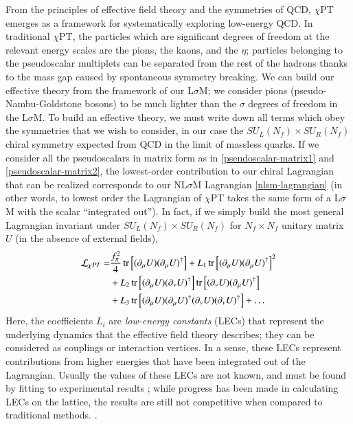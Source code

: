 \documentclass[aps,prd,onecolumn,showpacs,amsmath,amssymb,nofootinbib]{revtex4} \pdfoutput=1
\newcommand{\lsm}{L$\sigma$M}
\newcommand{\nlsm}{NL$\sigma$M}
\newcommand{\cpt}{$\chi$PT}
\begin{document}
From the principles of effective field theory and the symmetries of QCD, {\cpt} emerges as a framework for systematically exploring low-energy QCD. In traditional \cpt, the particles which are significant degrees of freedom at the relevant energy scales are the pions, the kaons, and the $\eta$; particles belonging to the pseudoscalar multiplets can be separated from the rest of the hadrons thanks to the mass gap caused by spontaneous symmetry breaking. We can build our effective theory from the framework of our {\lsm}; we consider pions (pseudo-Nambu-Goldstone bosons) to be much lighter than the $\sigma$ degrees of freedom in the {\lsm}. To build an effective theory, we must write down all terms which obey the symmetries that we wish to consider, in our case the ${S\!U}_L(N_f)\times {S\!U}_R(N_f)$ chiral symmetry expected from QCD in the limit of massless quarks. If we consider all the pseudoscalars in matrix form as in \eqref{pseudoscalar-matrix1} and \eqref{pseudoscalar-matrix2}, the lowest-order contribution to our chiral Lagrangian that can be realized corresponds to our {\nlsm} Lagrangian \eqref{nlsm-lagrangian} (in other words, to lowest order the Lagrangian of {\cpt} takes the same form of a {\lsm} with the scalar ``integrated out''). In fact, if we simply build the most general Lagrangian invariant under ${S\!U}_L(N_f)\times {S\!U}_R(N_f)$ for $N_f \times N_f$ unitary matrix $U$ (in the absence of external fields),
\begin{align}
    \label{cpt-lagrangian-massless}
    \mathcal{L}_{\chi PT} = & \frac{f_{\pi}^{2}}{4} \tr \left[(\partial_{\mu} U)(\partial_{\mu} U)^{\dagger}\right] + L_{1} \tr \left[(\partial_{\mu} U)(\partial_{\mu} U)^{\dagger}\right]^{2} \\
    & + L_{2}\tr \left[(\partial_{\mu} U)(\partial_{\nu} U)^{\dagger}\right]\tr \left[(\partial_{\nu} U)(\partial_{\mu} U)^{\dagger}\right] \\
    & + L_{3} \tr \left[(\partial_{\mu} U)(\partial_{\mu} U)^{\dagger}(\partial_{\nu} U)(\partial_{\nu} U)^{\dagger} \right] + \ldots
\end{align}
Here, the coefficients $L_i$ are \textit{low-energy constants} (LECs) that represent the underlying dynamics that the effective field theory describes; they can be considered as couplings or interaction vertices. In a sense, these LECs represent contributions from higher energies that have been integrated out of the Lagrangian. Usually the values of these LECs are not known, and must be found by fitting to experimental results \cite{Gasser1984,Bijnens2014}; while progress has been made in calculating LECs on the lattice, the results are still not competitive when compared to traditional methods. \cite{Bijnens2014}.
\end{document}
